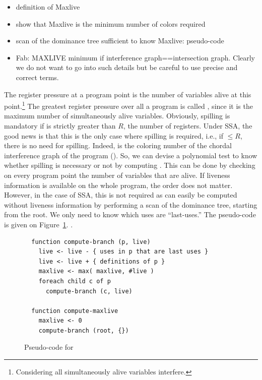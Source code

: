 {{\sl
\begin{itemize}
  \item definition of Maxlive
  \item show that Maxlive is the minimum number of colors required
  \item scan of the dominance tree sufficient to know Maxlive: pseudo-code
  \item Fab: MAXLIVE minimum if interference graph==intersection graph. Clearly we do not want to go into such details but be careful to use precise and correct terms.
\end{itemize}
}
    
The register pressure at a program point is the number of variables alive at 
this point.\footnote{Considering all simultaneously alive variables interfere.}
The greatest register pressure over all a program is called \maxlive, 
since it is the maximum number of simultaneously alive variables. Obviously, 
spilling is mandatory if \maxlive is strictly greater than $R$, the number of 
registers.
Under SSA, the good news is that this is the only case where spilling is 
required, i.e., if \maxlive $\leq R$, there is no need for spilling. Indeed, 
\maxlive is the coloring number of the chordal interference graph of the 
program (). So, we can devise a polynomial test to know 
whether spilling is necessary or not by computing \maxlive. This can be done by 
checking on every program point the number of variables that are alive. If 
liveness information is available on the whole program, the order does not 
matter. However, in the case of SSA, this is not required as \maxlive can 
easily be computed without liveness information by performing a scan of the 
dominance tree, starting from the root. We only need to know which uses are 
``last-uses.'' The pseudo-code is given on Figure~\ref{code:compute-maxlive}.
.


\begin{figure}[ht]
  \begin{verbatim}
  function compute-branch (p, live)
    live <- live - { uses in p that are last uses }
    live <- live + { definitions of p }
    maxlive <- max( maxlive, #live )
    foreach child c of p
      compute-branch (c, live)

  function compute-maxlive
    maxlive <- 0
    compute-branch (root, {})
  \end{verbatim}
  \caption{Pseudo-code for \maxlive}
  \label{code:compute-maxlive}
\end{figure}





}
